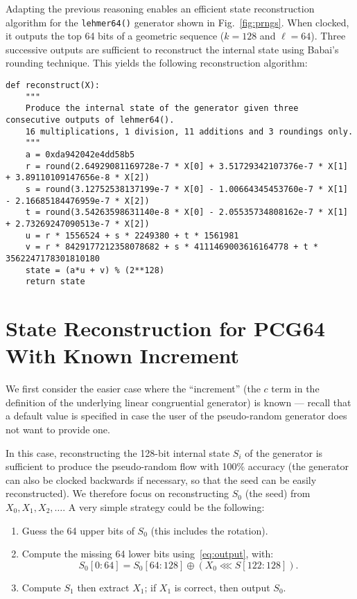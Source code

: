 \documentclass[submission,svgnames,journal=tosc]{iacrtrans}
\begin{document}
Adapting the previous reasoning enables an efficient state reconstruction
algorithm for the \texttt{lehmer64()} generator shown in
Fig.~\ref{fig:prngs}. When clocked, it outputs the top 64 bits of a geometric
sequence ($k=128$ and $\ell=64$). Three successive outputs are sufficient to
reconstruct the internal state using Babai's rounding technique. This yields the
following reconstruction algorithm:
\begin{verbatim}
def reconstruct(X):
    """
    Produce the internal state of the generator given three consecutive outputs of lehmer64().
    16 multiplications, 1 division, 11 additions and 3 roundings only.
    """
    a = 0xda942042e4dd58b5
    r = round(2.64929081169728e-7 * X[0] + 3.51729342107376e-7 * X[1] + 3.89110109147656e-8 * X[2])
    s = round(3.12752538137199e-7 * X[0] - 1.00664345453760e-7 * X[1] - 2.16685184476959e-7 * X[2])
    t = round(3.54263598631140e-8 * X[0] - 2.05535734808162e-7 * X[1] + 2.73269247090513e-7 * X[2])
    u = r * 1556524 + s * 2249380 + t * 1561981
    v = r * 8429177212358078682 + s * 4111469003616164778 + t * 3562247178301810180
    state = (a*u + v) % (2**128)
    return state
\end{verbatim}


\section{State Reconstruction for \textsf{PCG64} With Known Increment}
\label{sec:Cknown}

We first consider the easier case where the ``increment'' (the $c$ term in the
definition of the underlying linear congruential generator) is known --- recall
that a default value is specified in case the user of the pseudo-random
generator does not want to provide one.

In this case, reconstructing the 128-bit internal state $S_i$ of the generator
is sufficient to produce the pseudo-random flow with 100\% accuracy (the
generator can also be clocked backwards if necessary, so that the seed can be
easily reconstructed). We therefore focus on reconstructing $S_0$ (the seed)
from $X_0, X_1, X_2, \dots$. A very simple strategy could be the following:
\begin{enumerate}
\item Guess the 64 upper bits of $S_0$ (this includes the rotation).
\item Compute the missing 64 lower bits using~\eqref{eq:output}, with:
\[
   S_0[0:64] = S_0[64:128] \oplus (X_0  \lll S[122:128]).
\]
\item Compute $S_1$ then extract $X_1$; if $X_1$ is correct, then output $S_0$.
\end{enumerate}
\end{document}
